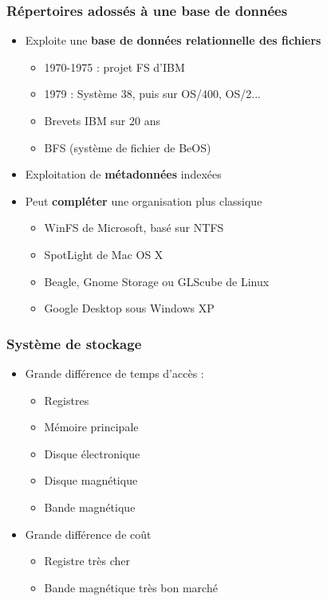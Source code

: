 \begin{frame}
\frametitle{Répertoires adossés à une base de données}
\begin{itemize}
\item Exploite une \textbf{base de données relationnelle des fichiers}
\begin{itemize}
\item 1970-1975 : projet FS d'IBM
\item 1979 : Système 38, puis sur OS/400, OS/2...
\item Brevets IBM sur 20 ans
\item BFS (système de fichier de BeOS)
\end{itemize}
\item Exploitation de \textbf{métadonnées} indexées
\item Peut \textbf{compléter} une organisation plus classique
\begin{itemize}
\item WinFS de Microsoft, basé sur NTFS
\item SpotLight de Mac OS X
\item Beagle, Gnome Storage ou GLScube de Linux
\item Google Desktop sous Windows XP
\end{itemize}
\end{itemize}
\end{frame}


\begin{frame}
\frametitle{Système de stockage}
\begin{itemize}
\item Grande différence de temps d’accès :
\begin{itemize}
\item Registres
\item Mémoire principale
\item Disque électronique
\item Disque magnétique
\item Bande magnétique
\end{itemize}
\item Grande différence de coût
\begin{itemize}
\item Registre très cher
\item Bande magnétique très bon marché
\end{itemize}
\end{itemize}
\end{frame}


